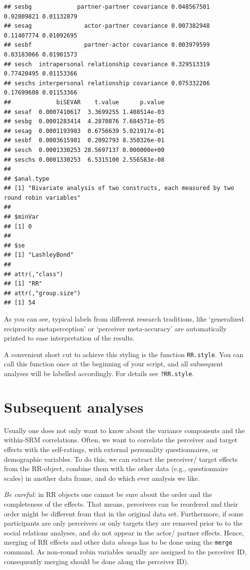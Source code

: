 \documentclass[a4paper]{article}\usepackage[]{graphicx}\usepackage[]{color}
\makeatletter
\newenvironment{kframe}{%
 \def\at@end@of@kframe{}%
 \ifinner\ifhmode%
  \def\at@end@of@kframe{\end{minipage}}%
  \begin{minipage}{\columnwidth}%
 \fi\fi%
 \def\FrameCommand##1{\hskip\@totalleftmargin \hskip-\fboxsep
 \colorbox{shadecolor}{##1}\hskip-\fboxsep
     \hskip-\linewidth \hskip-\@totalleftmargin \hskip\columnwidth}%
 \MakeFramed {\advance\hsize-\width
   \@totalleftmargin\z@ \linewidth\hsize
   \@setminipage}}%
 {\par\unskip\endMakeFramed%
 \at@end@of@kframe}
\newenvironment{knitrout}{}{} %
\makeatother
\begin{document}
\begin{knitrout}
\begin{kframe}
\begin{verbatim}
## sesbg             partner-partner covariance 0.048567501   0.92809821 0.01132879
## sesag               actor-partner covariance 0.007382948   0.11407774 0.01092695
## sesbf               partner-actor covariance 0.003979599   0.03183066 0.01901573
## sesch  intrapersonal relationship covariance 0.329513319   0.77420495 0.01153366
## seschs interpersonal relationship covariance 0.075332206   0.17699608 0.01153366
##             biSEVAR    t.value      p.value
## sesaf  0.0007410617  3.3699255 1.408514e-03
## sesbg  0.0001283414  4.2870876 7.684571e-05
## sesag  0.0001193983  0.6756639 5.021917e-01
## sesbf  0.0003615981  0.2092793 8.350326e-01
## sesch  0.0001330253 28.5697137 0.000000e+00
## seschs 0.0001330253  6.5315100 2.556583e-08
## 
## $anal.type
## [1] "Bivariate analysis of two constructs, each measured by two round robin variables"
## 
## $minVar
## [1] 0
## 
## $se
## [1] "LashleyBond"
## 
## attr(,"class")
## [1] "RR"
## attr(,"group.size")
## [1] 54
\end{verbatim}
\end{kframe}
\end{knitrout}
\par\vspace{5mm}

As you can see, typical labels from different research traditions, like `generalized reciprocity metaperception' or `perceiver meta-accuracy' are automatically printed to ease interpretation of the results.

A convenient short cut to achieve this styling is the function \texttt{RR.style}. You can call this function once at the beginning of your script, and all subsequent analyses will be labelled accordingly. For details see \texttt{?RR.style}.



\section{Subsequent analyses} %
\label{sec:subsequent_analyses}
Usually one does not only want to know about the variance components and the within-SRM correlations. Often, we want to correlate the perceiver and target effects with the self-ratings, with external personality questionnaires, or demographic variables. To do this, we can extract the perceiver/ target effects from the RR-object, combine them with the other data (e.g., questionnaire scales) in another data frame, and do which ever analysis we like.

\emph{Be careful:} in RR objects one cannot be sure about the order and the completeness of the effects. That means, perceivers can be reordered and their order might be different from that in the original data set. Furthermore, if some participants are only perceivers or only targets they are removed prior to to the social relations analyses, and do not appear in the actor/ partner effects. Hence, merging of RR effects and other data \emph{always} has to be done using the \texttt{merge} command. As non-round robin variables usually are assigned to the perceiver ID, consequently merging should be done along the perceiver ID).
\end{document}
